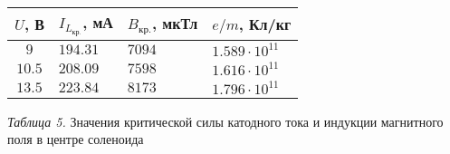 \begin{center}
    \hypertarget{table3}{}

    \renewcommand{\arraystretch}{1.8}

    \begin{tabular}{|c|C{2.5cm}|C{2.5cm}|C{3cm}|}
        \hline
        $U$, В & $I_{L_{\text{кр.}}}$, мА & $B_\text{кр.}$, мкТл & $e/m$, Кл/кг  \\
        \hline
        $9$ & $194.31$ & $7094$ & $1.589 \cdot 10^{11}$        \\
        \hline
        $10.5$ & $208.09$ & $7598$ & $1.616 \cdot 10^{11}$ \\
        \hline
        $13.5$ & $223.84$ & $8173$ & $1.796 \cdot 10^{11}$ \\
        \hline
    \end{tabular}

    \smallvspace

    \textit{Таблица 5.} Значения критической силы катодного тока и индукции 
    магнитного поля в центре соленоида

\end{center}